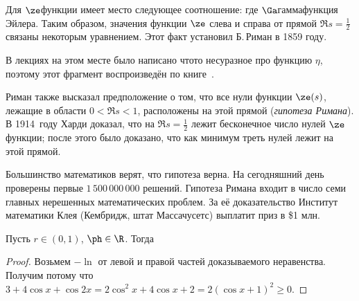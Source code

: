 \documentclass[a4paper]{article}
\begin{document}
Для $\ze$\д функции имеет место следующее соотношение:
где $\Ga$\т гамма\д функция  Эйлера.
Таким образом, значения функции $\ze$ слева и справа от прямой $\Re s = \frac12$ связаны некоторым уравнением.
Этот факт установил Б.\,Риман в 1859 году.

\begin{petit}
В лекциях на этом месте было написано что\д то несуразное про функцию $\eta$,
поэтому этот фрагмент воспроизведён по книге~\cite{gnsh}.
\end{petit}

Риман также высказал предположение о том, что все нули функции $\ze(s)$, лежащие в области $0<\Re s<1$,
расположены на этой прямой (\emph{гипотеза Римана}).
В 1914~году Харди доказал, что на $\Re s=\frac12$ лежит бесконечное число нулей $\ze$\д функции; после
этого было доказано, что как минимум треть нулей лежит на этой прямой.

Большинство математиков верят, что гипотеза верна. На сегодняшний день проверены первые $1\,500\,000\,000$
решений. Гипотеза Римана входит в число семи главных нерешенных математических проблем. За её доказательство
Институт математики Клея (Кембридж, штат Массачусетс) выплатит приз в \$1 млн.

\begin{lemma}\label{lem:prodBound}
Пусть $r\in(0,1)$, $\ph\in\R$. Тогда
\end{lemma}

\begin{proof}
Возьмем $-\ln$ от левой и правой частей доказываемого неравенства. Получим
потому что $3+4\cos x+\cos 2x=2\cos^2x+4\cos x+2=2(\cos x+1)^2\ge0$.
\end{proof}
\end{document}

